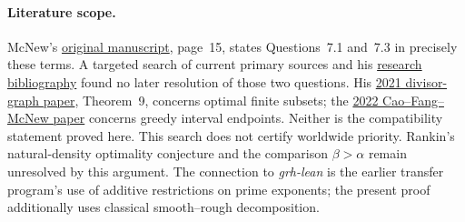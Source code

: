 \paragraph{Literature scope.}
McNew's
\href{https://www.nathanmcnew.com/GPFsets.pdf}{original manuscript},
page~15, states Questions~7.1 and~7.3 in precisely these terms. A targeted
search of current primary sources and his
\href{https://www.nathanmcnew.com/math.html}{research bibliography}
found no later resolution of those two questions. His
\href{https://arxiv.org/html/1808.04923v2}{2021 divisor-graph paper},
Theorem~9, concerns optimal finite subsets; the
\href{https://www.nathanmcnew.com/w45.pdf}{2022 Cao--Fang--McNew paper}
concerns greedy interval endpoints. Neither is the compatibility statement
proved here. This search does not certify worldwide priority. Rankin's
natural-density optimality conjecture and the comparison $\beta>\alpha$
remain unresolved by this argument. The connection to \emph{grh-lean} is the
earlier transfer program's use of additive restrictions on prime exponents;
the present proof additionally uses classical smooth--rough decomposition.
